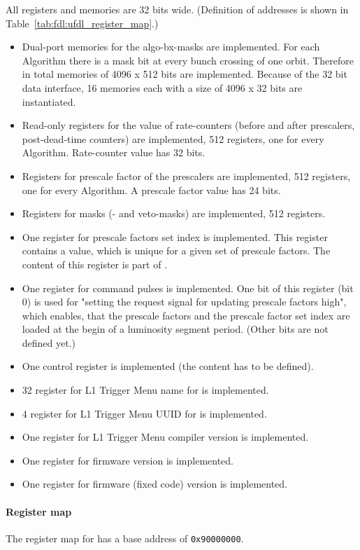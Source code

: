 All registers and memories are 32 bits wide. (Definition of addresses is shown in Table~\ref{tab:fdl:ufdl_register_map}.)

\begin {itemize}
\item Dual-port memories for the algo-bx-masks are implemented. For each Algorithm there is a mask bit at every bunch crossing of one orbit. Therefore in total memories of 4096 x 512 bits
are implemented. Because of the 32 bit data interface, 16 memories each with a size of 4096 x 32 bits are instantiated.
\item Read-only registers for the value of rate-counters (before and after prescalers, post-dead-time counters) are implemented, 512 registers, one for every Algorithm. Rate-counter value has 32 bits.
\item Registers for prescale factor of the prescalers are implemented, 512 registers, one for every Algorithm. A prescale factor value has 24 bits.
\item Registers for masks (\finor- and veto-masks) are implemented, 512 registers.
\item One register for prescale factors set index is implemented. This register contains a value, which is unique for a given set of prescale factors. The content of this register is
part of \record.
\item One register for command pulses is implemented. One bit of this register (bit 0) is used for "setting the request signal for updating prescale factors high", which enables, that the prescale factors and the prescale factor set index
are loaded at the begin of a luminosity segment period. (Other bits are not defined yet.)
\item One control register is implemented (the content has to be defined).
\item 32 register for L1 Trigger Menu name for \ugtl is implemented.
\item 4 register for L1 Trigger Menu UUID for \ugtl is implemented.
\item One register for L1 Trigger Menu compiler version is implemented.
\item One register for \ufdl firmware version is implemented.
\item One register for \ugtl firmware (fixed code) version is implemented.
\end {itemize}

\paragraph{Register map}
\label{sec:fdl:reg_map}
The register map for \ufdl has a base address of \verb|0x90000000|.

